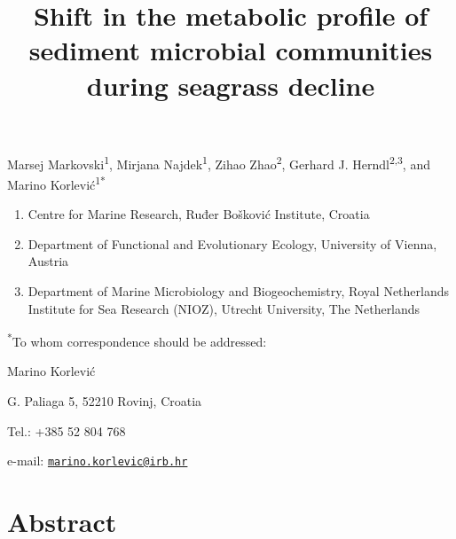 \documentclass[
  12 pt,
]{article}
\title{\textbf{Shift in the metabolic profile of sediment microbial communities during seagrass decline}}
\author{}
\date{\vspace{-2.5em}}
\begin{document}
\maketitle


\renewcommand{\figurename}{Fig.}
\renewcommand{\thefigure}{\arabic{figure}}

\vspace{\fill}

Marsej Markovski\textsuperscript{1}, Mirjana Najdek\textsuperscript{1}, Zihao Zhao\textsuperscript{2}, Gerhard J. Herndl\textsuperscript{2,3}, and Marino Korlević\textsuperscript{1*}

\begin{enumerate}
\def\labelenumi{\arabic{enumi}.}
\item
  Centre for Marine Research, Ruđer Bošković Institute, Croatia
\item
  Department of Functional and Evolutionary Ecology, University of Vienna, Austria
\item
  Department of Marine Microbiology and Biogeochemistry, Royal Netherlands Institute for Sea Research (NIOZ), Utrecht University, The Netherlands
\end{enumerate}

\textsuperscript{*}To whom correspondence should be addressed:

Marino Korlević

G. Paliaga 5, 52210 Rovinj, Croatia

Tel.: +385 52 804 768

e-mail: \href{mailto:marino.korlevic@irb.hr}{\nolinkurl{marino.korlevic@irb.hr}}

\linenumbers
{}
\setlength\parindent{24pt}
\newpage

\hypertarget{abstract}{%
\section{Abstract}\label{abstract}}
\end{document}
